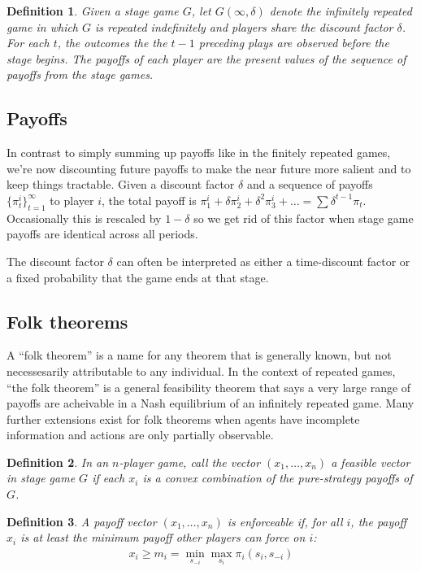 \documentclass[letter, 10pt]{article}
\theoremstyle{basic}
\newtheorem{definition}{Definition}[section]
\newcommand{\noti}{{{\scriptscriptstyle-}\!i}}
\begin{document}
\begin{spacing}{1.0}
\begin{definition}
  Given a stage game $G$, let $G(\infty, \delta)$ denote
  the infinitely repeated game in which $G$ is repeated
  indefinitely and players share the discount factor
  $\delta$. For each $t$, the outcomes the the $t-1$
  preceding plays are observed before the stage
  begins. The payoffs of each player are the present
  values of the sequence of payoffs from the stage games.
\end{definition}

\subsection{Payoffs}
 In contrast to simply summing up payoffs like in the
 finitely repeated games, we're now discounting future
 payoffs to make the near future more salient and to keep
 things tractable. Given a discount factor $\delta$ and a
 sequence of payoffs $\{\pi_t^i\}_{t=1}^\infty$ to player
 $i$, the total payoff is
 $\pi_1^i+\delta\pi_2^i+\delta^2\pi_3^i+\ldots = \sum
 \delta^{t-1} \pi_t$. Occasionally this is rescaled by
 $1-\delta$ so we get rid of this factor when stage game
 payoffs are identical across all periods.

 The discount factor $\delta$ can often be interpreted as either a
time-discount factor or a fixed probability that the game ends at that stage.


\subsection{Folk theorems}

A ``folk theorem'' is a name for any theorem that is generally known, but
not necessesarily attributable to any individual. In the context of
repeated games, ``the folk theorem'' is a general feasibility theorem that
says a very large range of payoffs are acheivable in a Nash equilibrium of
an infinitely repeated game. Many further extensions exist for folk
theorems when agents have incomplete information and actions are only
partially observable.

\begin{definition}
  In an $n$-player game, call the vector $(x_1,\ldots,
  x_n)$ a \emph{feasible vector} in stage game $G$ if each $x_i$
  is a convex combination of the pure-strategy payoffs of $G$.
\end{definition}

\begin{definition}
  A payoff vector $(x_1, \ldots, x_n)$ is \emph{enforceable} if, for all $i$, the
  payoff $x_i$ is at least the minimum payoff other players can force on $i$:
  \begin{align*}
    x_i \ge m_i = \min_{s_\noti} \max_{s_i} \pi_i(s_i, s_\noti)
  \end{align*}
\end{definition}


\end{spacing}
\end{document}
